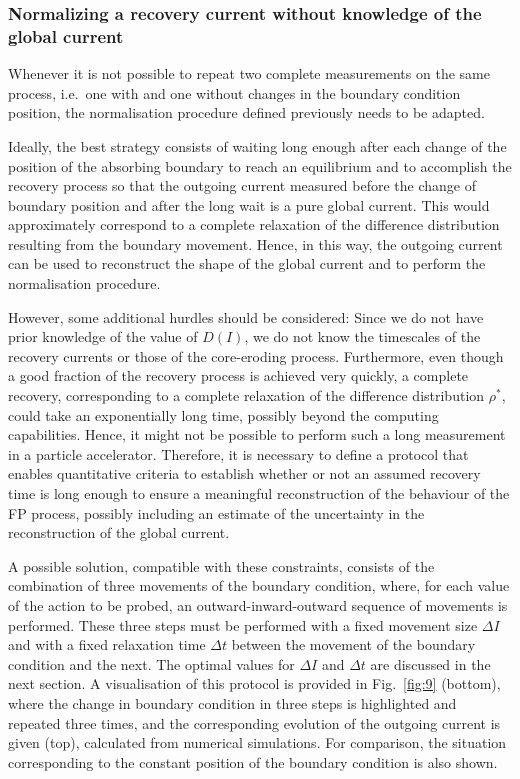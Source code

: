 
\subsubsection{Normalizing a recovery current without knowledge of the global current}


Whenever it is not possible to repeat two complete measurements on the same process, i.e.\ one with and one without changes in the boundary condition position, the normalisation procedure defined previously needs to be adapted.

Ideally, the best strategy consists of waiting long enough after each change of the position of the absorbing boundary to reach an equilibrium and to accomplish the recovery process so that the outgoing current measured before the change of boundary position and after the long wait is a pure global current. This would approximately correspond to a complete relaxation of the difference distribution resulting from the boundary movement. Hence, in this way, the outgoing current can be used to reconstruct the shape of the global current and to perform the normalisation procedure.

However, some additional hurdles should be considered: Since we do not have prior knowledge of the value of $D(I)$, we do not know the timescales of the recovery currents or those of the core-eroding process. Furthermore, even though a good fraction of the recovery process is achieved very quickly, a complete recovery, corresponding to a complete relaxation of the difference distribution $\rho^\ast$, could take an exponentially long time, possibly beyond the computing capabilities. Hence, it might not be possible to perform such a long measurement in a particle accelerator. Therefore, it is necessary to define a protocol that enables quantitative criteria to establish whether or not an assumed recovery time is long enough to ensure a meaningful reconstruction of the behaviour of the FP process, possibly including an estimate of the uncertainty in the reconstruction of the global current.

A possible solution, compatible with these constraints, consists of the combination of three movements of the boundary condition, where, for each value of the action to be probed, an outward-inward-outward sequence of movements is performed. These three steps must be performed with a fixed movement size $\Delta I$ and with a fixed relaxation time $\Delta t$ between the movement of the boundary condition and the next. The optimal values for $\Delta I$ and $\Delta t$ are discussed in the next section. A visualisation of this protocol is provided in Fig.~\ref{fig:9} (bottom), where the change in boundary condition in three steps is highlighted and repeated three times, and the corresponding evolution of the outgoing current is given (top), calculated from numerical simulations. For comparison, the situation corresponding to the constant position of the boundary condition is also shown.

